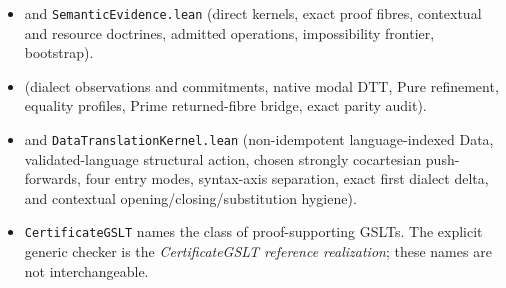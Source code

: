 \documentclass[11pt]{article}
\newcommand{\code}[1]{\texttt{#1}}
\begin{document}
\begin{itemize}
  POPL 2019 (extensional-to-intensional translation by explicit transports),
  together with the \code{ett-to-itt} formalization and Lean4Less's adaptation.
\item {} and
  \code{SemanticEvidence.lean} (direct kernels, exact proof fibres, contextual and
  resource doctrines, admitted operations, impossibility frontier, bootstrap).
\item {}
  (dialect observations and commitments, native modal DTT, Pure refinement,
  equality profiles, Prime returned-fibre bridge, exact parity audit).
\item {} and
  \code{DataTranslationKernel.lean} (non-idempotent language-indexed Data,
  validated-language structural action, chosen strongly cocartesian push-forwards,
  four entry modes, syntax-axis separation, exact first dialect delta, and
  contextual opening/closing/substitution hygiene).
\item \code{CertificateGSLT} names the class of proof-supporting GSLTs.  The explicit
  generic checker is the \emph{CertificateGSLT reference realization}; these names are
  not interchangeable.
\end{itemize}
\end{document}
